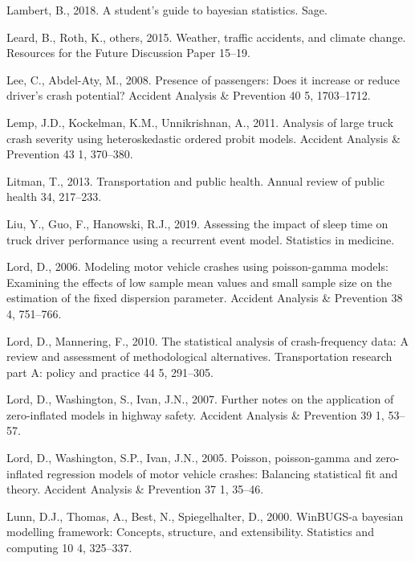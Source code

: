 \documentclass[12pt]{book}
\numberwithin{equation}{chapter}
\begin{document}
\leavevmode\hypertarget{ref-lambert2018student}{}%
Lambert, B., 2018. A student's guide to bayesian statistics. Sage.

\leavevmode\hypertarget{ref-leard2015weather}{}%
Leard, B., Roth, K., others, 2015. Weather, traffic accidents, and climate change. Resources for the Future Discussion Paper 15--19.

\leavevmode\hypertarget{ref-lee2008presence}{}%
Lee, C., Abdel-Aty, M., 2008. Presence of passengers: Does it increase or reduce driver's crash potential? Accident Analysis \& Prevention 40 5, 1703--1712.

\leavevmode\hypertarget{ref-lemp2011analysis}{}%
Lemp, J.D., Kockelman, K.M., Unnikrishnan, A., 2011. Analysis of large truck crash severity using heteroskedastic ordered probit models. Accident Analysis \& Prevention 43 1, 370--380.

\leavevmode\hypertarget{ref-litman2013transportation}{}%
Litman, T., 2013. Transportation and public health. Annual review of public health 34, 217--233.

\leavevmode\hypertarget{ref-liu2019assessing}{}%
Liu, Y., Guo, F., Hanowski, R.J., 2019. Assessing the impact of sleep time on truck driver performance using a recurrent event model. Statistics in medicine.

\leavevmode\hypertarget{ref-lord2006modeling}{}%
Lord, D., 2006. Modeling motor vehicle crashes using poisson-gamma models: Examining the effects of low sample mean values and small sample size on the estimation of the fixed dispersion parameter. Accident Analysis \& Prevention 38 4, 751--766.

\leavevmode\hypertarget{ref-lord2010statistical}{}%
Lord, D., Mannering, F., 2010. The statistical analysis of crash-frequency data: A review and assessment of methodological alternatives. Transportation research part A: policy and practice 44 5, 291--305.

\leavevmode\hypertarget{ref-lord2007further}{}%
Lord, D., Washington, S., Ivan, J.N., 2007. Further notes on the application of zero-inflated models in highway safety. Accident Analysis \& Prevention 39 1, 53--57.

\leavevmode\hypertarget{ref-lord2005poisson}{}%
Lord, D., Washington, S.P., Ivan, J.N., 2005. Poisson, poisson-gamma and zero-inflated regression models of motor vehicle crashes: Balancing statistical fit and theory. Accident Analysis \& Prevention 37 1, 35--46.

\leavevmode\hypertarget{ref-lunn2000winbugs}{}%
Lunn, D.J., Thomas, A., Best, N., Spiegelhalter, D., 2000. WinBUGS-a bayesian modelling framework: Concepts, structure, and extensibility. Statistics and computing 10 4, 325--337.
\end{document}
